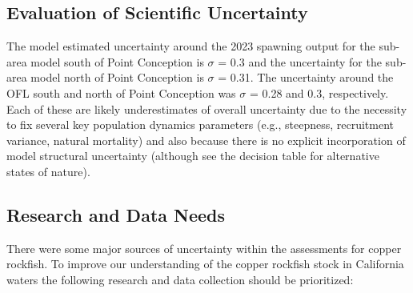 \documentclass[11pt,
  letterpaper,
]{article}
\begin{document}
\subsection{Evaluation of Scientific Uncertainty}\label{evaluation-of-scientific-uncertainty}

The model estimated uncertainty around the 2023 spawning output for the sub-area model south of Point Conception is \(\sigma\) = 0.3 and the uncertainty for the sub-area model north of Point Conception is \(\sigma\) = 0.31. The uncertainty around the OFL south and north of Point Conception was \(\sigma\) = 0.28 and 0.3, respectively. Each of these are likely underestimates of overall uncertainty due to the necessity to fix several key population dynamics parameters (e.g., steepness, recruitment variance, natural mortality) and also because there is no explicit incorporation of model structural uncertainty (although see the decision table for alternative states of nature).

\subsection{Research and Data Needs}\label{research-and-data-needs-1}

There were some major sources of uncertainty within the assessments for copper rockfish. To improve our understanding of the copper rockfish stock in California waters the following research and data collection should be prioritized:
\end{document}
